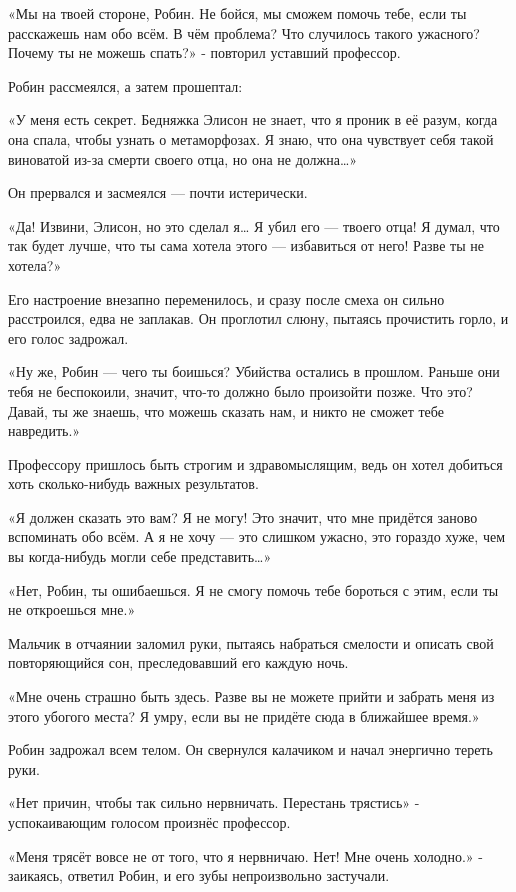 \documentclass[a4paper,12pt]{book}
\begin{document}
«Мы на твоей стороне, Робин. Не бойся, мы сможем помочь тебе, если ты расскажешь нам обо всём. В чём проблема? Что случилось такого ужасного? Почему ты не можешь спать?» - повторил уставший профессор.
\par
Робин рассмеялся, а затем прошептал:
\par
«У меня есть секрет. Бедняжка Элисон не знает, что я проник в её разум, когда она спала, чтобы узнать о метаморфозах. Я знаю, что она чувствует себя такой виноватой из-за смерти своего отца, но она не должна…»
\par
Он прервался и засмеялся — почти истерически.
\par
«Да! Извини, Элисон, но это сделал я… Я убил его — твоего отца! Я думал, что так будет лучше, что ты сама хотела этого — избавиться от него! Разве ты не хотела?»
\par
Его настроение внезапно переменилось, и сразу после смеха он сильно расстроился, едва не заплакав. Он проглотил слюну, пытаясь прочистить горло, и его голос задрожал.
\par
«Ну же, Робин — чего ты боишься? Убийства остались в прошлом. Раньше они тебя не беспокоили, значит, что-то должно было произойти позже. Что это? Давай, ты же знаешь, что можешь сказать нам, и никто не сможет тебе навредить.»
\par
Профессору пришлось быть строгим и здравомыслящим, ведь он хотел добиться хоть сколько-нибудь важных результатов.
\par
«Я должен сказать это вам? Я не могу! Это значит, что мне придётся заново вспоминать обо всём. А я не хочу — это слишком ужасно, это гораздо хуже, чем вы когда-нибудь могли себе представить…»
\par
«Нет, Робин, ты ошибаешься. Я не смогу помочь тебе бороться с этим, если ты не откроешься мне.»
\par
Мальчик в отчаянии заломил руки, пытаясь набраться смелости и описать свой повторяющийся сон, преследовавший его каждую ночь.
\par
«Мне очень страшно быть здесь. Разве вы не можете прийти и забрать меня из этого убогого места? Я умру, если вы не придёте сюда в ближайшее время.»
\par
Робин задрожал всем телом. Он свернулся калачиком и начал энергично тереть руки.
\par
«Нет причин, чтобы так сильно нервничать. Перестань трястись» - успокаивающим голосом произнёс профессор.
\par
«Меня трясёт вовсе не от того, что я нервничаю. Нет! Мне очень холодно.» - заикаясь, ответил Робин, и его зубы непроизвольно застучали.
\end{document}
